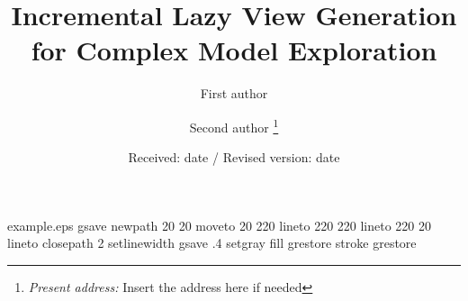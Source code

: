 %
%
%
%
\begin{filecontents*}{example.eps}
gsave
newpath
  20 20 moveto
  20 220 lineto
  220 220 lineto
  220 20 lineto
closepath
2 setlinewidth
gsave
  .4 setgray fill
grestore
stroke
grestore
\end{filecontents*}
%
\documentclass[global,twocolumn]{svjour}
%
\usepackage{graphicx}

%
%

%
\title{Incremental Lazy View Generation for Complex Model Exploration}
\author{First author \and Second author%
\thanks{\emph{Present address:} Insert the address here if needed}%
}                     %
%
\offprints{}          %
%
%
\date{Received: date / Revised version: date}
%
\maketitle
%
\begin{abstract}
Insert your abstract here.
\end{abstract}
%
\section{Introduction}
\label{introduction}
Your text comes here. Separate text sections with


